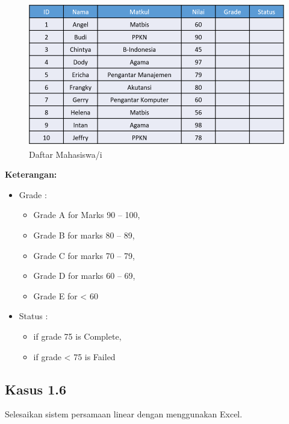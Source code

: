 \documentclass[
]{book}
\providecommand{\tightlist}{%
  \setlength{\itemsep}{0pt}\setlength{\parskip}{0pt}}
\begin{document}
\begin{figure}

{\centering \includegraphics[width=1\linewidth]{images/tabel5} 

}

\caption{Daftar Mahasiswa/i}\label{fig:tabel5}
\end{figure}

\textbf{Keterangan:}

\begin{itemize}
\item
  Grade :

  \begin{itemize}
  \tightlist
  \item
    Grade A for Marks 90 -- 100,
  \item
    Grade B for marks 80 -- 89,
  \item
    Grade C for marks 70 -- 79,
  \item
    Grade D for marks 60 -- 69,
  \item
    Grade E for \textless{} 60
  \end{itemize}
\item
  Status :

  \begin{itemize}
  \tightlist
  \item
    if grade 75 is Complete,
  \item
    if grade \textless{} 75 is Failed
  \end{itemize}
\end{itemize}

\hypertarget{kasus-1.6}{%
\subsection*{Kasus 1.6}\label{kasus-1.6}}

Selesaikan sistem persamaan linear dengan menggunakan Excel.

  
\end{document}
